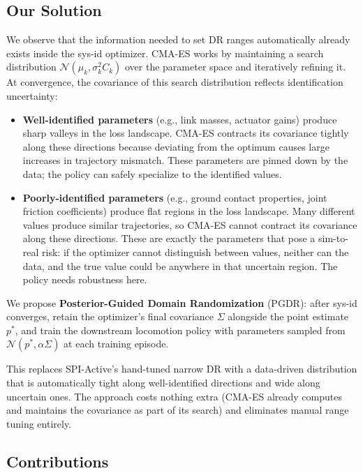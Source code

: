 \documentclass[10pt,twocolumn]{article}
\begin{document}
\subsection{Our Solution}

We observe that the information needed to set DR ranges automatically already exists inside the sys-id optimizer.
CMA-ES works by maintaining a search distribution $\mathcal{N}(\mu_k, \sigma_k^2 C_k)$ over the parameter space and iteratively refining it.
At convergence, the covariance of this search distribution reflects identification uncertainty:

\begin{itemize}
    \item \textbf{Well-identified parameters} (e.g., link masses, actuator gains) produce sharp valleys in the loss landscape. CMA-ES contracts its covariance tightly along these directions because deviating from the optimum causes large increases in trajectory mismatch. These parameters are pinned down by the data; the policy can safely specialize to the identified values.
    \item \textbf{Poorly-identified parameters} (e.g., ground contact properties, joint friction coefficients) produce flat regions in the loss landscape. Many different values produce similar trajectories, so CMA-ES cannot contract its covariance along these directions. These are exactly the parameters that pose a sim-to-real risk: if the optimizer cannot distinguish between values, neither can the data, and the true value could be anywhere in that uncertain region. The policy needs robustness here.
\end{itemize}

We propose \textbf{Posterior-Guided Domain Randomization} (PGDR): after sys-id converges, retain the optimizer's final covariance $\Sigma$ alongside the point estimate $p^*$, and train the downstream locomotion policy with parameters sampled from $\mathcal{N}(p^*, \alpha\Sigma)$ at each training episode.

This replaces SPI-Active's hand-tuned narrow DR with a data-driven distribution that is automatically tight along well-identified directions and wide along uncertain ones.
The approach costs nothing extra (CMA-ES already computes and maintains the covariance as part of its search) and eliminates manual range tuning entirely.

\subsection{Contributions}
\end{document}
